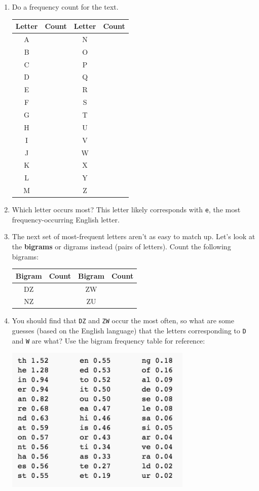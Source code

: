\documentclass[12pt]{amsart}
\theoremstyle{plain}
\theoremstyle{definition}
\theoremstyle{remark}
\begin{document}
\begin{enumerate}[1.]
	\item Do a frequency count for the text.\\
	\begin{center}\begin{tabular}{|c|p{1in}||c|p{1in}|}\hline
	Letter & Count & Letter & Count\\\hline
	A&&N&\\
	B&&O&\\
	C&&P&\\
	D&&Q&\\
	E&&R&\\
	F&&S&\\
	G&&T&\\
	H&&U&\\
	I&&V&\\
	J&&W&\\
	K&&X&\\
	L&&Y&\\
	M&&Z&\\ \hline
	\end{tabular}\end{center}
	\item Which letter occurs most?  This letter likely corresponds with \texttt{e}, the most frequency-occurring English letter.\\ \vspace{.5in}
	\item The next set of most-frequent letters aren't as easy to match up.  Let's look at the \textbf{bigrams} or digrams instead (pairs of letters).  Count the following bigrams:
	\begin{center}\begin{tabular}{|c|p{1in}||c|p{1in}|}\hline
	Bigram & Count & Bigram & Count\\\hline
	DZ&&ZW&\\
	NZ&&ZU&\\ \hline
	\end{tabular}\end{center}
	\item You should find that \texttt{DZ} and \texttt{ZW} occur the most often, so what are some guesses (based on the English language) that the letters corresponding to \texttt{D} and \texttt{W} are what?  Use the bigram frequency table for reference:
	\begin{center}
	\includegraphics[width=3.5in]{Bigram.jpg}\\

\end{center}
\end{enumerate}
\end{document}
